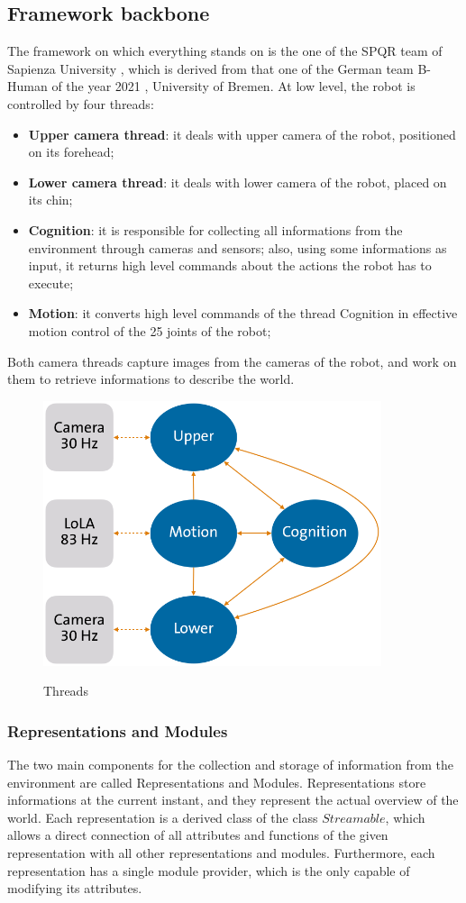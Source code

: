 \documentclass[a4paper, onecolumn, 12pt]{article}
\begin{document}
\subsection{Framework backbone}
\label{sec:framework}
The framework on which everything stands on is the one of the SPQR team of Sapienza University \cite{spqr},
which is derived from that one of the
German team B-Human of the year 2021 \cite{bhuman2023}, University of Bremen. At low level, the robot is 
controlled by four threads:
\begin{itemize}
    \item \textbf{Upper camera thread}: it deals with upper camera of the robot, positioned on its forehead;
    \item \textbf{Lower camera thread}: it deals with lower camera of the robot, placed on its chin;
    \item \textbf{Cognition}: it is responsible for collecting all informations from the 
    environment through cameras and sensors; also, using some informations as input,
    it returns high level commands about the actions the robot has to execute;
    \item \textbf{Motion}: it converts high level commands of the thread Cognition in effective
    motion control of the 25 joints of the robot;
\end{itemize}
Both camera threads capture images from the cameras of the robot, and work on them 
to retrieve informations to describe the world.

\begin{figure}
    \centering
    \includegraphics[width=0.5\linewidth]{assets/threads.png}
    \label{fig:threads}
    \caption{Threads}
\end{figure}

\subsubsection{Representations and Modules}
The two main components for the collection and storage of information from the environment
are called Representations and Modules.
Representations store informations at the current instant, and they represent the actual overview
of the world. Each representation is a derived class of the class $Streamable$, which allows a 
direct connection of all attributes and functions of the given representation with all other
representations and modules. Furthermore, each representation has a single module provider, which
is the only capable of modifying its attributes.
\end{document}
